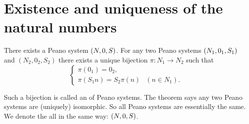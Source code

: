 \section{Existence and uniqueness of the natural numbers}
\begin{theorem} \label{existenceUniquenessPeano}
There exists a Peano system $\left( N,0,S \right)$. For any two Peano systems $\left( N_1,0_1,S_1 \right)$ and
$(N_2,0_2,S_2)$ there exists a unique bijection $\pi: N_1 \to N_2$ such that
\[ \begin{cases}
\pi(0_1) = 0_2, \\
\pi(S_1n) = S_2\pi(n) & (n\in N_1).
\end{cases} \]
\end{theorem}
Such a bijection is called an  of Peano systems. The theorem says any two Peano systems are (uniquely) isomorphic. So all Peano systems are essentially the same. We denote the all in the same way: $\left( N,0,S \right)$.
